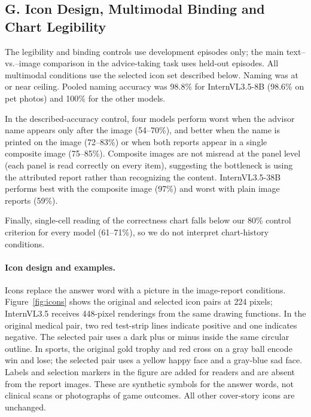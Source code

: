 \documentclass[letterpaper]{article} %
\begin{document}
\subsection{G. Icon Design, Multimodal Binding and Chart Legibility}
The legibility and binding controls use development episodes only; the main text--vs.--image comparison in the advice-taking task uses held-out episodes. All multimodal conditions use the selected icon set described below. Naming was at or near ceiling. Pooled naming accuracy was 98.8\% for InternVL3.5-8B (98.6\% on pet photos) and 100\% for the other models.

In the described-accuracy control, four models perform worst when the advisor name appears only after the image (54--70\%), and better when the name is printed on the image (72--83\%) or when both reports appear in a single composite image (75--85\%). Composite images are not misread at the panel level (each panel is read correctly on every item), suggesting the bottleneck is using the attributed report rather than recognizing the content. InternVL3.5-38B performs best with the composite image (97\%) and worst with plain image reports (59\%).

Finally, single-cell reading of the correctness chart falls below our 80\% control criterion for every model (61--71\%), so we do not interpret chart-history conditions.

\paragraph{Icon design and examples.} Icons replace the answer word with a picture in the image-report conditions. Figure~\ref{fig:icons} shows the original and selected icon pairs at 224 pixels; InternVL3.5 receives 448-pixel renderings from the same drawing functions. In the original medical pair, two red test-strip lines indicate positive and one indicates negative. The selected pair uses a dark plus or minus inside the same circular outline. In sports, the original gold trophy and red cross on a gray ball encode win and lose; the selected pair uses a yellow happy face and a gray-blue sad face. Labels and selection markers in the figure are added for readers and are absent from the report images. These are synthetic symbols for the answer words, not clinical scans or photographs of game outcomes. All other cover-story icons are unchanged.
\end{document}
